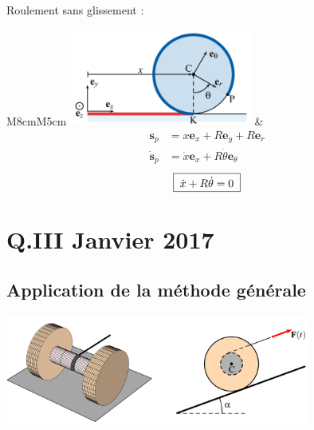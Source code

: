 \documentclass[a4paper]{article}
\begin{document}
Roulement sans glissement : 
\begin{center} \begin{tabular}{M{8cm}M{5cm}}
\includegraphics[width=0.45\textwidth]{Solides3.PNG}
&
\[ \begin{aligned}
\textbf{s}_p &= x \textbf{e}_x + R \textbf{e}_y + R \textbf{e}_r \\
\dot{\textbf{s}}_p &= \dot{x} \textbf{e}_x + R \dot{\theta} \textbf{e}_\theta
\end{aligned} \]
\[ \fbox{$ \; \dot{x} + R \dot{\theta} = 0 \; $} \]
\end{tabular} \end{center}













\newpage













\section{Q.III Janvier 2017}





\subsection{Application de la méthode générale}





\begin{center} \includegraphics[width=0.75\textwidth]{Q3Jan2017.PNG} \end{center}
\end{document}
